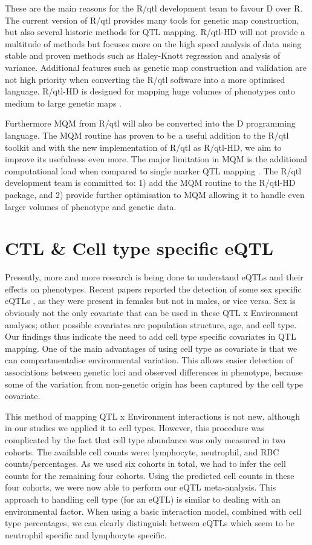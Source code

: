 These are the main reasons for the R/qtl development team to favour D over R. The current version of R/qtl provides many tools for genetic map 
construction, but also several historic methods for QTL mapping. R/qtl-HD will not provide a multitude of methods but focuses more on the high 
speed analysis of data using stable and proven methods such as Haley-Knott regression \cite{Haley:1992} and analysis of variance. Additional features such 
as genetic map construction and validation are not high priority when converting the R/qtl software into a more optimised language. R/qtl-HD 
is designed for mapping huge volumes of phenotypes onto medium to large genetic maps \cite{Trelles:2011}.

Furthermore MQM from R/qtl will also be converted into the D programming language. The MQM routine has proven to be a useful addition to the R/qtl 
toolkit and with the new implementation of R/qtl as R/qtl-HD, we aim to improve its usefulness even more. The major limitation in MQM is the additional 
computational load when compared to single marker QTL mapping \cite{Arends:2010}. The R/qtl development team is committed to: 1) add the MQM routine to the 
R/qtl-HD package, and 2) provide further optimisation to MQM allowing it to handle even larger volumes of phenotype and genetic data.

\section{CTL \& Cell type specific eQTL}
Presently, more and more research is being done to understand eQTLs and their effects on phenotypes. Recent papers reported the detection of some sex 
specific eQTLs \cite{Ramos:1999, Bernatchez:2008, Lusis:2010}, as they were present in females but not in males, or vice versa. Sex is obviously not 
the only covariate that can be used in these QTL x Environment analyses; other possible covariates are population structure, age, and cell type. Our 
findings thus indicate the need to add cell type specific covariates in QTL mapping. One of the main advantages of using cell type as covariate is 
that we can compartmentalise environmental variation. This allows easier detection of associations between genetic loci and observed differences in 
phenotype, because some of the variation from non-genetic origin has been captured by the cell type covariate.

This method of mapping QTL x Environment interactions is not new, although in our studies we applied it to cell types. However, this procedure was 
complicated by the fact that cell type abundance was only measured in two cohorts. The available cell counts were: lymphocyte, neutrophil, and RBC 
counts/percentages. As we used six cohorts in total, we had to infer the cell counts for the remaining four cohorts. Using the predicted cell counts 
in these four cohorts, we were now able to perform our eQTL meta-analysis. This approach to handling cell type (for an eQTL) is similar to dealing 
with an environmental factor. When using a basic interaction model, combined with cell type percentages, we can clearly distinguish between eQTLs 
which seem to be neutrophil specific and lymphocyte specific.


